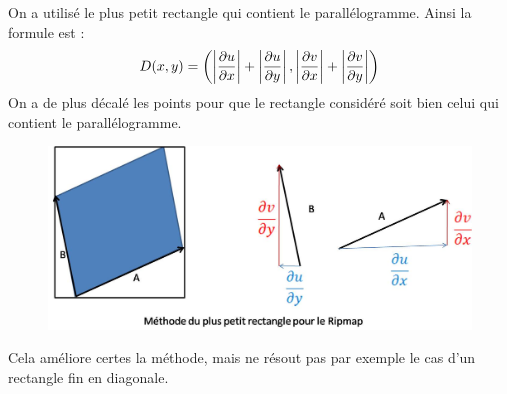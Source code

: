On a utilisé le plus petit rectangle qui contient le parallélogramme. Ainsi la formule est :
$$D(x,y) = \left( \left|\frac{\partial u}{\partial x}\right|+\left|\frac{\partial u}{\partial y}\right|,\left|\frac{\partial v}{\partial x}\right|+\left|\frac{\partial v}{\partial y}\right|\right)$$
On a de plus décalé les points pour que le rectangle considéré soit bien celui qui contient le parallélogramme.

\begin{figure}[h!]
\centering
\includegraphics[scale=0.5]{methode_distance_ripmap.jpg}
\end{figure}

Cela améliore certes la méthode, mais ne résout pas par exemple le cas d'un rectangle fin en diagonale.

